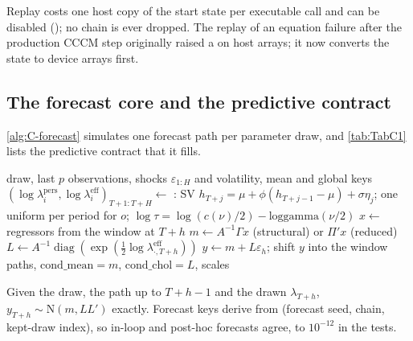 Replay costs one host copy of the start state per executable call and can be disabled
(); no chain is ever dropped.
The replay of an equation failure after the production CCCM step originally raised a
 on host arrays; it now converts the state to device arrays first.

\subsection{The forecast core and the predictive contract}\label{app:alg-forecast}

\cref{alg:C-forecast} simulates one forecast path per parameter draw, and \cref{tab:TabC1} lists
the predictive contract that it fills.

\begin{algorithm}[!htbp]
\caption{Forecast core for one parameter draw (,
).}
\label{alg:C-forecast}
\footnotesize
\begin{algorithmic}[1]
\Require draw, last $p$ observations, shocks $\varepsilon_{1:H}$ and volatility, mean and global keys
\State $(\log\lambda^{\mathrm{pers}}_i, \log\lambda^{\mathrm{eff}}_i)_{T+1:T+H} \gets$ : SV $h_{T+j} = \mu + \phi(h_{T+j-1} - \mu) + \sigma\eta_j$; one uniform per period for $o$; $\log\tau = \log(c(\nu)/2) - \mathrm{loggamma}(\nu/2)$
  \State $x \gets$ regressors from the window at $T + h$
  \State $m \gets A^{-1}\Gamma x$ (structural) or $\Pi'x$ (reduced) 
  \State $L \gets A^{-1}\operatorname{diag}(\exp(\frac12\log\lambda^{\mathrm{eff}}_{\cdot,T+h}))$ 
  \State $y \gets m + L\varepsilon_h$; shift $y$ into the window
\EndFor
\State \Return paths, $\mathrm{cond\_mean} = m$, $\mathrm{cond\_chol} = L$, scales
\end{algorithmic}
\end{algorithm}

Given the draw, the path up to $T + h - 1$ and the drawn $\lambda_{T+h}$, $y_{T+h} \sim
\mathrm{N}(m, LL')$ exactly.
Forecast keys derive from (forecast seed, chain, kept-draw index), so in-loop and post-hoc forecasts
agree, to $10^{-12}$ in the tests.

